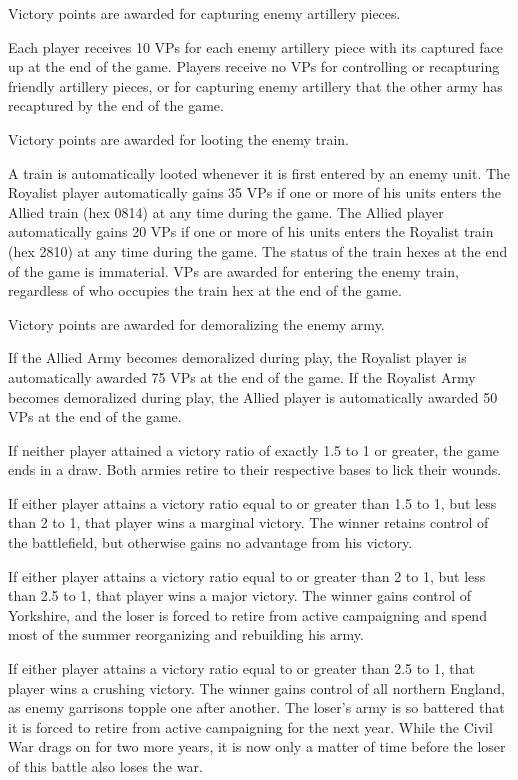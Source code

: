  Victory points are awarded for capturing enemy artillery pieces.

Each player receives 10 VPs for each enemy artillery piece with its captured face up at the end of the game. Players receive no VPs for controlling or recapturing friendly artillery pieces, or for capturing enemy artillery that the other army has recaptured by the end of the game.

 Victory points are awarded for looting the enemy train.

A train is automatically looted whenever it is first entered by an enemy unit. The Royalist player automatically gains 35 VPs if one or more of his units enters the Allied train (hex 0814) at any time during the game. The Allied player automatically gains 20 VPs if one or more of his units enters the Royalist train (hex 2810) at any time during the game. The status of the train hexes at the end of the game is immaterial. VPs are awarded for entering the enemy train, regardless of who occupies the train hex at the end of the game.

 Victory points are awarded for demoralizing the enemy army.

If the Allied Army becomes demoralized during play, the Royalist player is automatically awarded 75 VPs at the end of the game. If the Royalist Army becomes demoralized during play, the Allied player is automatically awarded 50 VPs at the end of the game.

 If neither player attained a victory ratio of exactly 1.5 to 1 or greater, the game ends in a draw. Both armies retire to their respective bases to lick their wounds.

 If either player attains a victory ratio equal to or greater than 1.5 to 1, but less than 2 to 1, that player wins a marginal victory. The winner retains control of the battlefield, but otherwise gains no advantage from his victory.

 If either player attains a victory ratio equal to or greater than 2 to 1, but less than 2.5 to 1, that player wins a major victory. The winner gains control of Yorkshire, and the loser is forced to retire from active campaigning and spend most of the summer reorganizing and rebuilding his army.

 If either player attains a victory ratio equal to or greater than 2.5 to 1, that player wins a crushing victory. The winner gains control of all northern England, as enemy garrisons topple one after another. The loser's army is so battered that it is forced to retire from active campaigning for the next year. While the Civil War drags on for two more years, it is now only a matter of time before the loser of this battle also loses the war.
